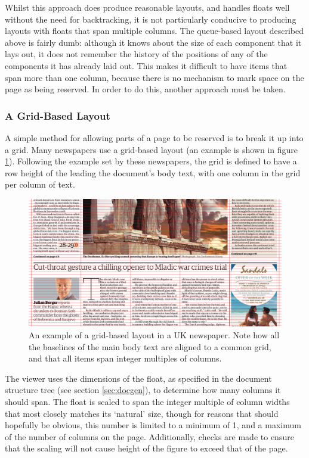 Whilst this approach does produce reasonable layouts, and handles floats well without the need for backtracking, it is not particularly conducive to producing layouts with floats that span multiple columns. The queue-based layout described above is fairly dumb: although it knows about the size of each component that it lays out, it does not remember the history of the positions of any of the components it has already laid out. This makes it difficult to have items that span more than one column, because there is no mechanism to mark space on the page as being reserved. In order to do this, another approach must be taken.

\subsubsection{A Grid-Based Layout}
A simple method for allowing parts of a page to be reserved is to break it up into a grid. Many newspapers use a grid-based layout (an example is shown in figure \ref{fig:gridlayout}). Following the example set by these newspapers, the grid is defined to have a row height of the leading the document's body text, with one column in the grid per column of text.

\begin{figure}
    \includegraphics[width=\textwidth]{gfx/newspaper-cropped}
    \caption[An example of a grid-based layout]{An example of a grid-based layout in a UK newspaper. Note how all the baselines of the main body text are aligned to a common grid, and that all items span integer multiples of columns.}
    \label{fig:gridlayout}
\end{figure}

The viewer uses the dimensions of the float, as specified in the document structure tree (see section \ref{sec:docgen}), to determine how many columns it should span. The float is scaled to span the integer multiple of column widths that most closely matches its `natural' size, though for reasons that should hopefully be obvious, this number is limited to a minimum of 1, and a maximum of the number of columns on the page. Additionally, checks are made to ensure that the scaling will not cause height of the figure to exceed that of the page.

